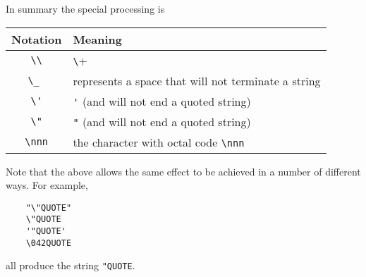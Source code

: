 In summary the special processing is
\begin{center}
\begin{tabular}{|c|l|} \hline
Notation   & Meaning \\ \hline
\verb+\\+   & \verb+\+ \\ \hline
\verb+\_ +  & represents a space that will not terminate a string \\ \hline
\verb+\'+   & \verb+'+  (and will not end a quoted string) \\ \hline
\verb+\"+   & \verb+"+ (and will not end a quoted string) \\ \hline
\verb+\nnn+ & the character with octal code \verb+\nnn+ \\ \hline
\end{tabular}
\end{center}

\noindent{}
Note that the above allows the same effect to be achieved in a number of 
different ways.  For example,
\begin{verbatim}
    "\"QUOTE" 
    \"QUOTE 
    '"QUOTE' 
    \042QUOTE 
\end{verbatim}
all produce the string \verb+"QUOTE+.

